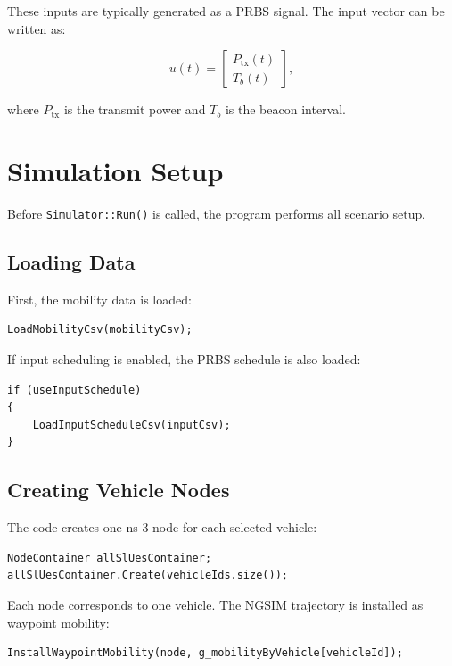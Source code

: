 \documentclass[11pt,a4paper]{article}
\begin{document}
These inputs are typically generated as a PRBS signal. The input vector can be written as:

\begin{equation}
u(t) =
\begin{bmatrix}
P_{\mathrm{tx}}(t) \\
T_b(t)
\end{bmatrix},
\end{equation}

where \(P_{\mathrm{tx}}\) is the transmit power and \(T_b\) is the beacon interval.

\section{Simulation Setup}

Before \texttt{Simulator::Run()} is called, the program performs all scenario setup.

\subsection{Loading Data}

First, the mobility data is loaded:

\begin{lstlisting}[style=cppstyle]
LoadMobilityCsv(mobilityCsv);
\end{lstlisting}

If input scheduling is enabled, the PRBS schedule is also loaded:

\begin{lstlisting}[style=cppstyle]
if (useInputSchedule)
{
    LoadInputScheduleCsv(inputCsv);
}
\end{lstlisting}

\subsection{Creating Vehicle Nodes}

The code creates one ns-3 node for each selected vehicle:

\begin{lstlisting}[style=cppstyle]
NodeContainer allSlUesContainer;
allSlUesContainer.Create(vehicleIds.size());
\end{lstlisting}

Each node corresponds to one vehicle. The NGSIM trajectory is installed as waypoint mobility:

\begin{lstlisting}[style=cppstyle]
InstallWaypointMobility(node, g_mobilityByVehicle[vehicleId]);
\end{lstlisting}
\end{document}
